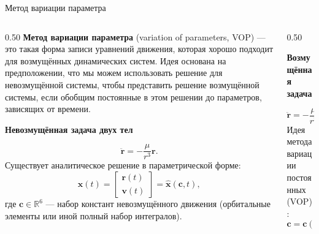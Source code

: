 \documentclass[8pt]{beamer}
\begin{document}
\begin{frame}{Метод вариации параметра}
\begin{columns}
    \begin{column}{0.50\textwidth}
        \justifying
        \textbf{Метод вариации параметра} (variation of parameters, VOP) — это такая форма записи уравнений движения, которая хорошо подходит для возмущённых динамических систем. Идея основана на предположении, что мы можем использовать решение для невозмущённой системы, чтобы представить решение возмущённой системы, если обобщим постоянные в этом решении до параметров, зависящих от времени. \\
        \begin{center}
            \textbf{Невозмущённая задача двух тел}
        \end{center}
        \begin{equation*}
            \ddot{\mathbf{r}} = -\frac{\mu}{r^3} \mathbf{r}.
        \end{equation*}
        Существует аналитическое решение в параметрической форме:
        \begin{equation*}
            \mathbf{x}(t) =
            \begin{bmatrix}
              \mathbf{r}(t) \\
              \mathbf{v}(t)
            \end{bmatrix}
            =
            \hat{\mathbf{x}}(\mathbf{c}, t),
        \end{equation*}
        где $\mathbf{c} \in \mathbb{R}^6$ — набор констант невозмущённого движения (орбитальные элементы или иной полный набор интегралов).
    \end{column}

    \begin{column}{0.50\textwidth}
    \begin{center}
        \textbf{Возмущённая задача}
    \end{center}
    \begin{equation*}
        \ddot{\mathbf{r}} = -\frac{\mu}{r^3}\,\mathbf{r} + \mathbf{a}_{\text{pert}}(\mathbf{r}, \mathbf{v}, t).
    \end{equation*}
    Идея метода вариации постоянных (VOP):
    \begin{equation*}
        \mathbf{c} = \mathbf{c}(t), \qquad
        \mathbf{x}(t) = \hat{\mathbf{x}}(\mathbf{c}(t), t).
    \end{equation*}


\end{column}
\end{columns}
\end{frame}
\end{document}
